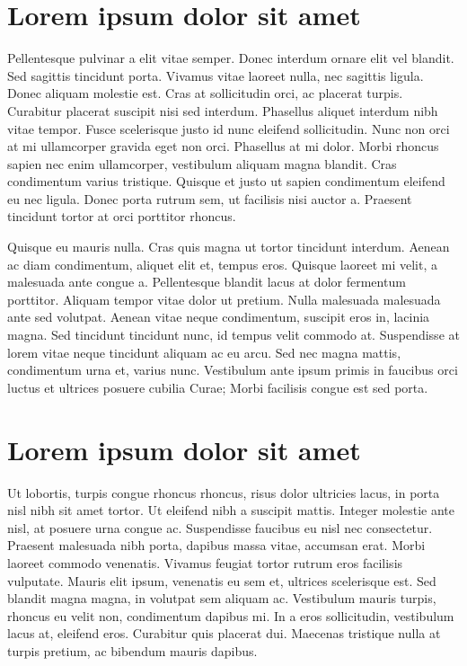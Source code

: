 \section{Lorem ipsum dolor sit amet}\label{sec:LABEL_CHP_1_SEC_G}
Pellentesque pulvinar a elit vitae semper. Donec interdum ornare elit vel blandit. Sed sagittis tincidunt porta. Vivamus vitae laoreet nulla, nec sagittis ligula. Donec aliquam molestie est. Cras at sollicitudin orci, ac placerat turpis. Curabitur placerat suscipit nisi sed interdum. Phasellus aliquet interdum nibh vitae tempor. Fusce scelerisque justo id nunc eleifend sollicitudin. Nunc non orci at mi ullamcorper gravida eget non orci. Phasellus at mi dolor. Morbi rhoncus sapien nec enim ullamcorper, vestibulum aliquam magna blandit. Cras condimentum varius tristique. Quisque et justo ut sapien condimentum eleifend eu nec ligula. Donec porta rutrum sem, ut facilisis nisi auctor a. Praesent tincidunt tortor at orci porttitor rhoncus.

Quisque eu mauris nulla. Cras quis magna ut tortor tincidunt interdum. Aenean ac diam condimentum, aliquet elit et, tempus eros. Quisque laoreet mi velit, a malesuada ante congue a. Pellentesque blandit lacus at dolor fermentum porttitor. Aliquam tempor vitae dolor ut pretium. Nulla malesuada malesuada ante sed volutpat. Aenean vitae neque condimentum, suscipit eros in, lacinia magna. Sed tincidunt tincidunt nunc, id tempus velit commodo at. Suspendisse at lorem vitae neque tincidunt aliquam ac eu arcu. Sed nec magna mattis, condimentum urna et, varius nunc. Vestibulum ante ipsum primis in faucibus orci luctus et ultrices posuere cubilia Curae; Morbi facilisis congue est sed porta.

\section{Lorem ipsum dolor sit amet}\label{sec:LABEL_CHP_1_SEC_H}
Ut lobortis, turpis congue rhoncus rhoncus, risus dolor ultricies lacus, in porta nisl nibh sit amet tortor. Ut eleifend nibh a suscipit mattis. Integer molestie ante nisl, at posuere urna congue ac. Suspendisse faucibus eu nisl nec consectetur. Praesent malesuada nibh porta, dapibus massa vitae, accumsan erat. Morbi laoreet commodo venenatis. Vivamus feugiat tortor rutrum eros facilisis vulputate. Mauris elit ipsum, venenatis eu sem et, ultrices scelerisque est. Sed blandit magna magna, in volutpat sem aliquam ac. Vestibulum mauris turpis, rhoncus eu velit non, condimentum dapibus mi. In a eros sollicitudin, vestibulum lacus at, eleifend eros. Curabitur quis placerat dui. Maecenas tristique nulla at turpis pretium, ac bibendum mauris dapibus.

